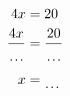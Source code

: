 \documentclass[varwidth]{standalone}
\begin{document}
    \begin{varwidth}{0.2\paperwidth} %
    \begin{align*}
    4x &= 20\\
    \frac{4x}{\dotuline{\hspace{4mm}}} &= \frac{20}{\dotuline{\hspace{4mm}}}\\
    x &= \dotuline{\hspace{4mm}}\\
    \end{align*}
    \end{varwidth}
\end{document}

